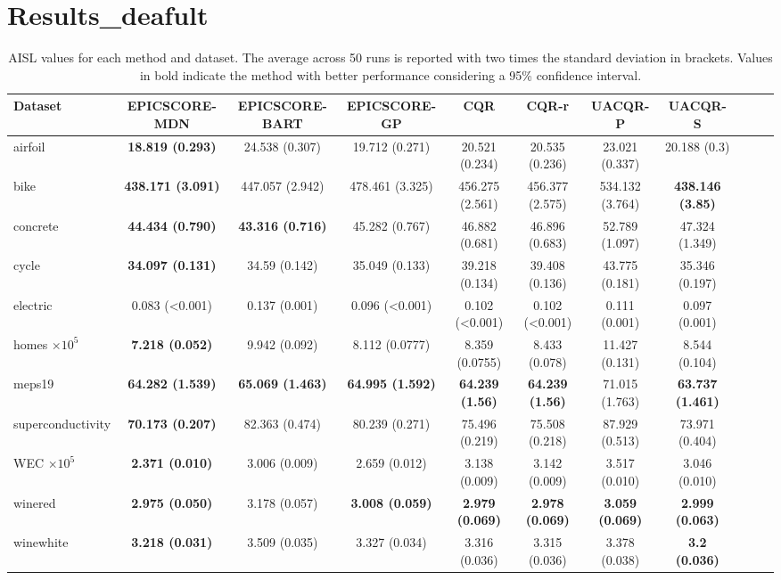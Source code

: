 \section{Results_deafult}

\begin{table*}[ht]
\caption{AISL values for each method and dataset. The average across 50 runs is reported with two times the standard deviation in brackets. Values in bold indicate the method with better performance considering a 95\% confidence interval.}
\label{tab:aisl}
\begin{adjustbox}{width = 0.9\textwidth,center}
\begin{tabular}{lcccccccccc}
\hline
\textbf{Dataset} & \textbf{EPICSCORE-MDN} & \textbf{EPICSCORE-BART} & \textbf{EPICSCORE-GP} & \textbf{CQR} & \textbf{CQR-r} & \textbf{UACQR-P} & \textbf{UACQR-S} \\
\hline

airfoil & \textbf{18.819 (0.293)} & 24.538 (0.307) & 19.712 (0.271) & 20.521 (0.234) & 20.535 (0.236) & 23.021 (0.337) & 20.188 (0.3)\\
bike & \textbf{438.171 (3.091)} & 447.057 (2.942) & 478.461 (3.325) & 456.275 (2.561) & 456.377 (2.575) & 534.132 (3.764) & \textbf{438.146 (3.85)}\\
concrete & \textbf{44.434 (0.790)} & \textbf{43.316 (0.716)} & 45.282 (0.767) & 46.882 (0.681) & 46.896 (0.683) & 52.789 (1.097) & 47.324 (1.349)\\
cycle & \textbf{34.097 (0.131)} & 34.59 (0.142) & 35.049 (0.133) & 39.218 (0.134) & 39.408 (0.136) & 43.775 (0.181) & 35.346 (0.197)\\
electric & 0.083 (<0.001) & 0.137 (0.001) & 0.096 (<0.001) & 0.102 (<0.001) & 0.102 (<0.001) & 0.111 (0.001) & 0.097 (0.001)\\
homes $\times 10^{5}$ & \textbf{7.218 (0.052) } & 9.942 (0.092) & 8.112 (0.0777) & 8.359 (0.0755) & 8.433 (0.078) & 11.427 (0.131) & 8.544 (0.104)\\
meps19 & \textbf{64.282 (1.539)} & \textbf{65.069 (1.463)} & \textbf{64.995 (1.592)} & \textbf{64.239 (1.56)} & \textbf{64.239 (1.56)} & 71.015 (1.763) & \textbf{63.737 (1.461)}\\
superconductivity & \textbf{70.173 (0.207)} & 82.363 (0.474) & 80.239 (0.271) & 75.496 (0.219) & 75.508 (0.218) & 87.929 (0.513) & 73.971 (0.404)\\
WEC $\times 10^{5}$ & \textbf{2.371 (0.010)} & 3.006 (0.009) & 2.659 (0.012) & 3.138 (0.009) & 3.142 (0.009) & 3.517 (0.010) & 3.046 (0.010)\\
winered & \textbf{2.975 (0.050)} & 3.178 (0.057) & \textbf{3.008 (0.059)} & \textbf{2.979 (0.069)} & \textbf{2.978 (0.069)} & \textbf{3.059 (0.069)} & \textbf{2.999 (0.063)}\\
winewhite & \textbf{3.218 (0.031)} & 3.509 (0.035) & 3.327 (0.034) & 3.316 (0.036) & 3.315 (0.036) & 3.378 (0.038) & \textbf{3.2 (0.036)}\\
\hline
\end{tabular}
\end{adjustbox}
\end{table*}

